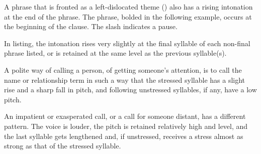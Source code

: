A phrase that is fronted as a left-dislocated theme () also has a rising intonation at the end of the phrase.  The phrase, bolded in the following example, occurs at the beginning of the clause.  The slash indicates a pause.

 

  
In listing, the intonation rises very slightly at the final syllable of each non-final phrase listed, or is retained at the same level as the previous syllable(s).


 

A polite way of calling a person, of getting someone's attention, is to call the name or relationship term in such a way that the stressed syllable has a slight rise and a sharp fall in pitch, and following unstressed syllables, if any, have a low pitch.




An impatient or exasperated call, or a call for someone distant, has a different pattern.  The voice is louder, the pitch is retained relatively high and level, and the last syllable gets lengthened and, if unstressed, receives a stress almost as strong as that of the stressed syllable.

